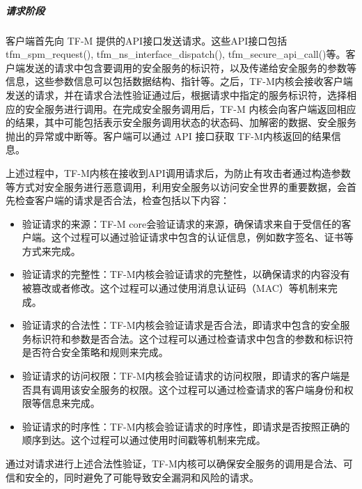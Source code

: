 \documentclass[UTF8,12pt,a4paper,twoside]{ctexart}
\numberwithin{figure}{section}
\begin{document}
\subparagraph{请求阶段}
\par 客户端首先向 TF-M 提供的API接口发送请求。这些API接口包括tfm\_spm\_request(), tfm\_ns\_interface\_dispatch(), tfm\_secure\_api\_call()等。客户端发送的请求中包含要调用的安全服务的标识符，以及传递给安全服务的参数等信息，这些参数信息可以包括数据结构、指针等。之后，TF-M内核会接收客户端发送的请求，并在请求合法性验证通过后，根据请求中指定的服务标识符，选择相应的安全服务进行调用。在完成安全服务调用后，TF-M 内核会向客户端返回相应的结果，其中可能包括表示安全服务调用状态的状态码、加解密的数据、安全服务抛出的异常或中断等。客户端可以通过 API 接口获取 TF-M内核返回的结果信息。
\par 上述过程中，TF-M内核在接收到API调用请求后，为防止有攻击者通过构造参数等方式对安全服务进行恶意调用，利用安全服务以访问安全世界的重要数据，会首先检查客户端的请求是否合法，检查包括以下内容：
\begin{itemize}
    \item 验证请求的来源：TF-M core会验证请求的来源，确保请求来自于受信任的客户端。这个过程可以通过验证请求中包含的认证信息，例如数字签名、证书等方式来完成。
    \item 验证请求的完整性：TF-M内核会验证请求的完整性，以确保请求的内容没有被篡改或者修改。这个过程可以通过使用消息认证码（MAC）等机制来完成。
    \item  验证请求的合法性：TF-M内核会验证请求是否合法，即请求中包含的安全服务标识符和参数是否合法。这个过程可以通过检查请求中包含的参数和标识符是否符合安全策略和规则来完成。
    \item  验证请求的访问权限：TF-M内核会验证请求的访问权限，即请求的客户端是否具有调用该安全服务的权限。这个过程可以通过检查请求的客户端身份和权限等信息来完成。
    \item  验证请求的时序性：TF-M内核会验证请求的时序性，即请求是否按照正确的顺序到达。这个过程可以通过使用时间戳等机制来完成。
\end{itemize}
\par 通过对请求进行上述合法性验证，TF-M内核可以确保安全服务的调用是合法、可信和安全的，同时避免了可能导致安全漏洞和风险的请求。
\end{document}
